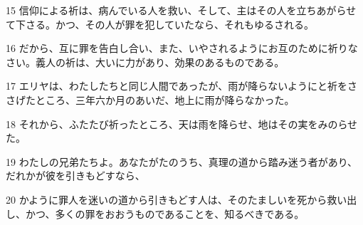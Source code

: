 \par 15 信仰による祈は、病んでいる人を救い、そして、主はその人を立ちあがらせて下さる。かつ、その人が罪を犯していたなら、それもゆるされる。
\par 16 だから、互に罪を告白し合い、また、いやされるようにお互のために祈りなさい。義人の祈は、大いに力があり、効果のあるものである。
\par 17 エリヤは、わたしたちと同じ人間であったが、雨が降らないようにと祈をささげたところ、三年六か月のあいだ、地上に雨が降らなかった。
\par 18 それから、ふたたび祈ったところ、天は雨を降らせ、地はその実をみのらせた。
\par 19 わたしの兄弟たちよ。あなたがたのうち、真理の道から踏み迷う者があり、だれかが彼を引きもどすなら、
\par 20 かように罪人を迷いの道から引きもどす人は、そのたましいを死から救い出し、かつ、多くの罪をおおうものであることを、知るべきである。


